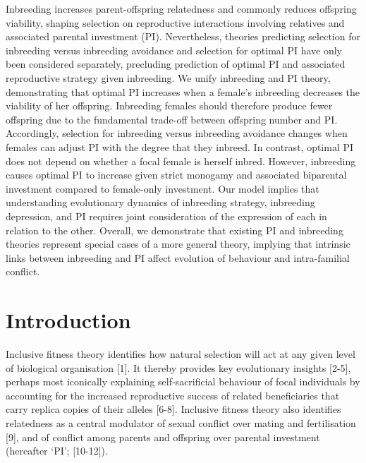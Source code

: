 \documentclass[12pt]{article}
\begin{document}
Inbreeding increases parent-offspring relatedness and commonly reduces offspring viability, shaping selection on reproductive interactions involving relatives and associated parental investment (PI). Nevertheless, theories predicting selection for inbreeding versus inbreeding avoidance and selection for optimal PI have only been considered separately, precluding prediction of optimal PI and associated reproductive strategy given inbreeding. We unify inbreeding and PI theory, demonstrating that optimal PI increases when a female's inbreeding decreases the viability of her offspring. Inbreeding females should therefore produce fewer offspring due to the fundamental trade-off between offspring number and PI. Accordingly, selection for inbreeding versus inbreeding avoidance changes when females can adjust PI with the degree that they inbreed. In contrast, optimal PI does not depend on whether a focal female is herself inbred. However, inbreeding causes optimal PI to increase given strict monogamy and associated biparental investment compared to female-only investment. Our model implies that understanding evolutionary dynamics of inbreeding strategy, inbreeding depression, and PI requires joint consideration of the expression of each in relation to the other. Overall, we demonstrate that existing PI and inbreeding theories represent special cases of a more general theory, implying that intrinsic links between inbreeding and PI affect evolution of behaviour and intra-familial conflict.


\section*{Introduction}

Inclusive fitness theory identifies how natural selection will act at any given level of biological organisation [1]. It thereby provides key evolutionary insights [2-5], perhaps most iconically explaining self-sacrificial behaviour of focal individuals by accounting for the increased reproductive success of related beneficiaries that carry replica copies of their alleles [6-8]. Inclusive fitness theory also identifies relatedness as a central modulator of sexual conflict over mating and fertilisation [9], and of conflict among parents and offspring over parental investment (hereafter `PI'; [10-12]). 
\end{document}
